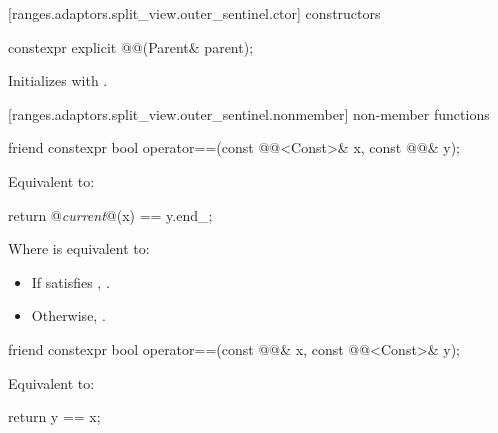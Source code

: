[ranges.adaptors.split_view.outer_sentinel.ctor]{ constructors}

%
\begin{itemdecl}
constexpr explicit @@(Parent& parent);
\end{itemdecl}

\begin{itemdescr}
\pnum
\effects Initializes  with .
\end{itemdescr}

[ranges.adaptors.split_view.outer_sentinel.nonmember]{ non-member functions}

%
\begin{itemdecl}
friend constexpr bool operator==(const @@<Const>& x, const @@& y);
\end{itemdecl}

\begin{itemdescr}
\pnum
\effects Equivalent to:
\begin{codeblock}
return @\textit{current}@(x) == y.end_;
\end{codeblock}

Where  is equivalent to:
\begin{itemize}
\item If  satisfies , .
\item Otherwise, .
\end{itemize}
\end{itemdescr}

%
\begin{itemdecl}
friend constexpr bool operator==(const @@& x, const @@<Const>& y);
\end{itemdecl}

\begin{itemdescr}
\pnum
\effects Equivalent to:
\begin{codeblock}
return y == x;
\end{codeblock}
\end{itemdescr}

